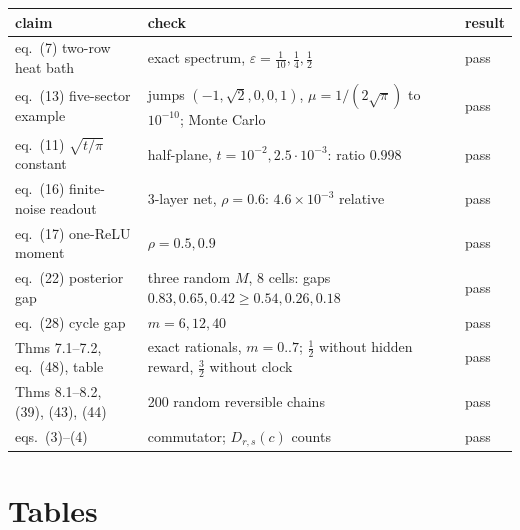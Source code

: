 \begin{center}\small
\begin{tabular}{@{}lll@{}}\toprule
claim & check & result\\\midrule
eq.~(7) two-row heat bath & exact spectrum, $\varepsilon=\frac1{10},\frac14,\frac12$ & pass\\
eq.~(13) five-sector example & jumps $(-1,\sqrt2,0,0,1)$, $\mu=1/(2\sqrt\pi)$ to $10^{-10}$; Monte Carlo & pass\\
eq.~(11) $\sqrt{t/\pi}$ constant & half-plane, $t=10^{-2},2.5\cdot10^{-3}$: ratio $0.998$ & pass\\
eq.~(16) finite-noise readout & 3-layer net, $\rho=0.6$: $4.6\times10^{-3}$ relative & pass\\
eq.~(17) one-ReLU moment & $\rho=0.5,0.9$ & pass\\
eq.~(22) posterior gap & three random $M$, 8 cells: gaps $0.83,0.65,0.42\ge0.54,0.26,0.18$ & pass\\
eq.~(28) cycle gap & $m=6,12,40$ & pass\\
Thms 7.1--7.2, eq.~(48), table & exact rationals, $m=0..7$; $\frac12$ without hidden reward, $\frac32$ without clock & pass\\
Thms 8.1--8.2, (39), (43), (44) & 200 random reversible chains & pass\\
eqs.~(3)--(4) & commutator; $D_{r,s}(c)$ counts & pass\\\bottomrule
\end{tabular}
\end{center}

\section{Tables}

